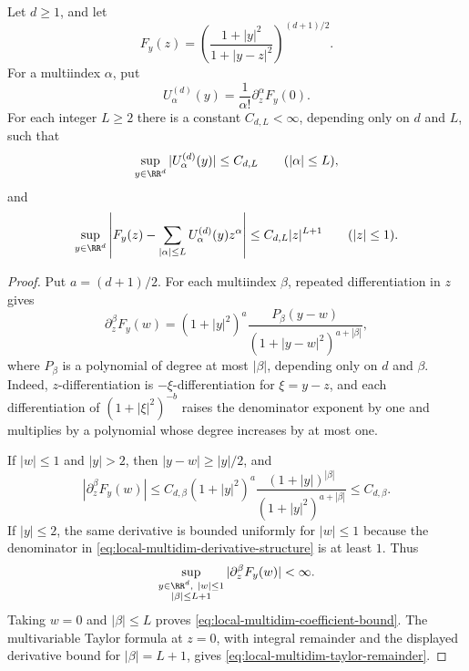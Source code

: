 \begin{lemma}%
\label{lem:local-multidim-quotient-taylor-remainder-core}
Let \(d\ge1\), and let
\[
F_y(z)=\left(\frac{1+|y|^2}{1+|y-z|^2}\right)^{(d+1)/2}.
\]
For a multiindex \(\alpha\), put
\[
U_\alpha^{(d)}(y)=\frac1{\alpha!}\partial_z^\alpha F_y(0).
\]
For each integer \(L\ge2\) there is a constant \(C_{d,L}<\infty\),
depending only on \(d\) and \(L\), such that
\begin{equation}\label{eq:local-multidim-coefficient-bound}
\sup_{y\in\RR^d}|U_\alpha^{(d)}(y)|\le C_{d,L}
\qquad (|\alpha|\le L),
\end{equation}
and
\begin{equation}\label{eq:local-multidim-taylor-remainder}
\sup_{y\in\RR^d}\left|
F_y(z)-\sum_{|\alpha|\le L}U_\alpha^{(d)}(y)z^\alpha
\right|
\le C_{d,L}|z|^{L+1}
\qquad (|z|\le1).
\end{equation}
\end{lemma}

\begin{proof}
Put \(a=(d+1)/2\).  For each multiindex \(\beta\), repeated
differentiation in \(z\) gives
\begin{equation}\label{eq:local-multidim-derivative-structure}
\partial_z^\beta F_y(w)
=(1+|y|^2)^a
\frac{P_\beta(y-w)}{(1+|y-w|^2)^{a+|\beta|}},
\end{equation}
where \(P_\beta\) is a polynomial of degree at most \(|\beta|\), depending
only on \(d\) and \(\beta\).  Indeed, \(z\)-differentiation is
\(-\xi\)-differentiation for \(\xi=y-z\), and each differentiation of
\((1+|\xi|^2)^{-b}\) raises the denominator exponent by one and multiplies
by a polynomial whose degree increases by at most one.

If \(|w|\le1\) and \(|y|>2\), then \(|y-w|\ge |y|/2\), and
\[
|\partial_z^\beta F_y(w)|
\le C_{d,\beta}
(1+|y|^2)^a
\frac{(1+|y|)^{|\beta|}}{(1+|y|^2)^{a+|\beta|}}
\le C_{d,\beta}.
\]
If \(|y|\le2\), the same derivative is bounded uniformly for \(|w|\le1\)
because the denominator in \eqref{eq:local-multidim-derivative-structure}
is at least \(1\).  Thus
\[
\sup_{\substack{y\in\RR^d,\ |w|\le1\\ |\beta|\le L+1}}
|\partial_z^\beta F_y(w)|<\infty .
\]
Taking \(w=0\) and \(|\beta|\le L\) proves
\eqref{eq:local-multidim-coefficient-bound}.  The multivariable Taylor
formula at \(z=0\), with integral remainder and the displayed derivative
bound for \(|\beta|=L+1\), gives
\eqref{eq:local-multidim-taylor-remainder}.
\end{proof}

